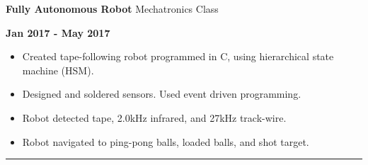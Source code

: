 \documentclass[paper=a4,fontsize=11pt]{article} %
\def \sectionSpace      {0.3cm}     %
\def \subSectionSpace   {0.25cm}    %
\def \leftColSpace      {0.1}       %
\def \middleColSpace    {0.71}      %
\def \bigMiddleColSpace {0.8}       %
\def \rightColSpace     {0.25}      %
\def \lineWidth         {20.25cm}   %
\def \lineThickness     {1pt}       %
\begin{document}
    \vspace{\subSectionSpace}  
    \noindent
    \begin{minipage}[t]{\leftColSpace\linewidth}
        \noindent \hfill
    \end{minipage}
    \begin{minipage}[t]{\middleColSpace\linewidth}
        \noindent \textbf{Fully Autonomous Robot} \quad Mechatronics Class
    \end{minipage}
    \begin{minipage}[t]{\rightColSpace\linewidth}
        \noindent \textbf{Jan 2017 - May 2017}
    \end{minipage}

    \noindent
    \begin{minipage}[t]{\leftColSpace\linewidth}
        \hfill
    \end{minipage}
    \begin{minipage}[t]{\bigMiddleColSpace\linewidth}
        \begin{itemize}[noitemsep,topsep=0pt]
        \item Created tape-following robot programmed in C, using hierarchical state machine (HSM). 
        \item Designed and soldered sensors. Used event driven programming. 
        \item Robot detected tape, 2.0kHz infrared, and 27kHz track-wire.\item Robot navigated to ping-pong balls, loaded balls, and shot target.
        \end{itemize}
    \end{minipage}

    \vspace{\sectionSpace}
    \noindent\rule{\lineWidth}{\lineThickness}
\end{document}
